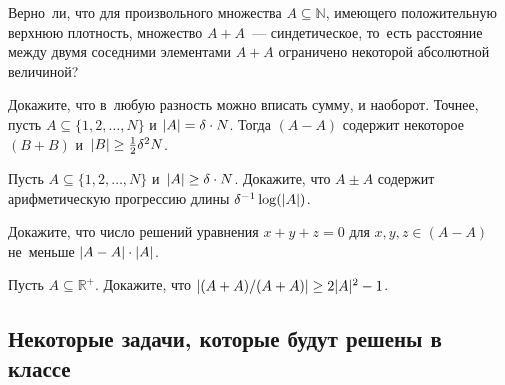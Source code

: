 \begin{problems}
\item
Верно~ли, что для произвольного множества $A \subseteq \mathbb{N}$, имеющего
положительную верхнюю плотность, множество $A + A$~--- синдетическое,
то~есть расстояние между двумя соседними элементами $A + A$ ограничено
некоторой абсолютной величиной?

\item
Докажите, что в~любую разность можно вписать сумму, и наоборот.
Точнее, пусть
$A \subseteq \{ 1, 2, \ldots, N \}$ и $\lvert A \rvert = \delta \cdot N$.
Тогда $(A - A)$ содержит некоторое $(B + B)$
и~$\lvert B \rvert \geq \frac{1}{2} \delta^2 N$.

\item
Пусть $A \subseteq \{ 1, 2, \ldots, N \}$ и~$\lvert A \rvert \geq \delta \cdot N$.
Докажите, что $A \pm A$ содержит арифметическую прогрессию длины
$\delta^{-1} \log(\lvert A \rvert)$.

\item
Докажите, что число решений уравнения $x + y + z = 0$ для $x, y, z \in (A - A)$
не~меньше $\lvert A - A \rvert \cdot \lvert A \rvert$.

\item
Пусть $A \subseteq \mathbb{R}^{+}$.
Докажите, что
\(
    \lvert (A + A) / (A + A) \rvert
\geq
    2 \lvert A \rvert^2 - 1
\).

\end{problems}


\subsection*{Некоторые задачи, которые будут решены в классе}
\resetproblem

